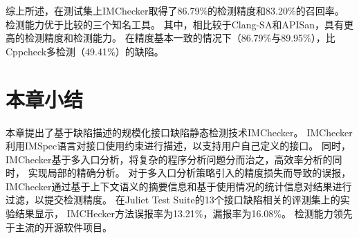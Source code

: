综上所述，在测试集上IMChecker取得了86.79\%的检测精度和83.20\%的召回率。
检测能力优于比较的三个知名工具。
其中，相比较于Clang-SA和APISan，具有更高的检测精度和检测能力。
在精度基本一致的情况下（86.79\%与89.95\%），比Cppcheck多检测（49.41\%）的缺陷。


\section{本章小结}
\label{sec:3.5}
本章提出了基于缺陷描述的规模化接口缺陷静态检测技术IMChecker。
IMChecker利用IMSpec语言对接口使用约束进行描述，以支持用户自己定义的接口。
同时，IMChecker基于多入口分析，将复杂的程序分析问题分而治之，高效率分析的同时，
实现局部的精确分析。
对于多入口分析策略引入的精度损失而导致的误报，
IMChecker通过基于上下文语义的摘要信息和基于使用情况的统计信息对结果进行过滤，以提交检测精度。
在Juliet Test Suite的13个接口缺陷相关的评测集上的实验结果显示，
IMCHecker方法误报率为13.21\%，漏报率为16.08\%。
检测能力领先于主流的开源软件项目。
